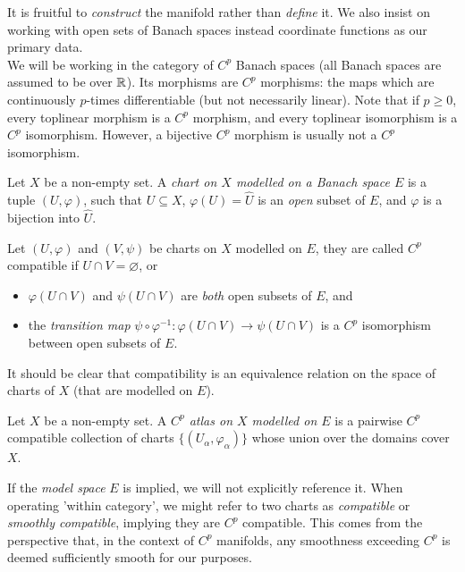 \documentclass[../main-manifolds.tex]{subfiles}
\begin{document}


It is fruitful to \emph{construct} the manifold rather than \emph{define} it. We also insist on working with open sets of Banach spaces instead coordinate functions as our primary data.\\

We will be working in the category of $C^p$ Banach spaces (all Banach spaces are assumed to be over $\mathbb{R}$). Its morphisms are $C^p$ morphisms: the maps which are continuously $p$-times differentiable (but not necessarily linear). Note that if $p\geq 0$, every toplinear morphism is a $C^p$ morphism, and every toplinear isomorphism is a $C^p$ isomorphism. However, a bijective $C^p$ morphism is usually not a $C^p$ isomorphism. 

\begin{definition}[Chart]\label{def:chart}
    Let $X$ be a non-empty set. A \emph{chart on $X$ modelled on a Banach space $E$} is a tuple $(U,\varphi)$, such that $U\subseteq X$,  $\varphi(U)=\hat{U}$ is an \emph{open} subset of $E$, and $\varphi$ is a bijection into $\hat{U}$.
\end{definition}
\begin{definition}[Compatibility]\label{def:compatibility}
    Let $(U,\varphi)$ and $(V,\psi)$ be charts on $X$ modelled on $E$, they are called $C^p$ compatible if $U\cap V=\varnothing$, or 
    \begin{itemize}
        \item $\varphi(U\cap V)$ and $\psi(U\cap V)$ are \emph{both} open subsets of $E$, and
        \item the \emph{transition map} $\psi\circ\varphi^{-1}: \varphi(U\cap V)\to \psi(U\cap V)$ is a $C^p$ isomorphism between open subsets of $E$.
    \end{itemize}
    It should be clear that compatibility is an equivalence relation on the space of charts of $X$ (that are modelled on $E$).
\end{definition}
\begin{definition}[Atlas]\label{def:atlas}
    Let $X$ be a non-empty set. A \emph{$C^p$ atlas on $X$ modelled on $E$} is a pairwise $C^p$ compatible collection of charts $\{(U_\alpha,\varphi_\alpha)\}$ whose union over the domains cover $X$.
\end{definition}
\begin{remark}[Omissions]
    If the \emph{model space} \( E \) is implied, we will not explicitly reference it. When operating 'within category', we might refer to two charts as \emph{compatible} or \emph{smoothly compatible}, implying they are $C^p$ compatible. This comes from the perspective that, in the context of $C^p$ manifolds, any smoothness exceeding $C^p$ is deemed sufficiently smooth for our purposes.
\end{remark}
\end{document}
